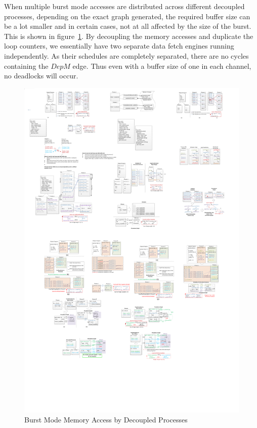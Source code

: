 When multiple burst mode accesses are distributed across different decoupled processes, 
depending on the exact graph generated, the required buffer size can be a lot smaller
and in certain cases, not at all affected by the size of the burst. This is shown in figure~\ref{fig:doubleProcess}. By decoupling the memory accesses and duplicate the loop counters, we essentially have two separate data fetch engines running independently. As their schedules are completely
separated, there are no cycles containing the $DepM$ edge. Thus even with
a buffer size of one in each channel, no deadlocks will occur.


\begin{figure}[htp]
\begin{center}
\includegraphics[width=0.9\linewidth]{chap4fig/doubleProcesses.pdf}
\caption{Burst Mode Memory Access by Decoupled Processes
\label{fig:doubleProcess}}
\end{center}
\end{figure}
 

